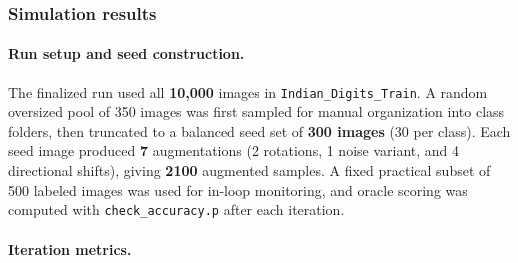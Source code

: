 \subsubsection{Simulation results}

\paragraph{Run setup and seed construction.}
The finalized run used all \textbf{10,000} images in \texttt{Indian\_Digits\_Train}. A random oversized pool of 350 images was first sampled for manual organization into class folders, then truncated to a balanced seed set of \textbf{300 images} (30 per class).
Each seed image produced \textbf{7} augmentations (2 rotations, 1 noise variant, and 4 directional shifts), giving \textbf{2100} augmented samples. A fixed practical subset of 500 labeled images was used for in-loop monitoring, and oracle scoring was computed with \texttt{check\_accuracy.p} after each iteration.

\paragraph{Iteration metrics.}
\begin{table}[H]
\centering
\caption{Pipeline 2 iteration metrics (active learning + pseudo-labeling)}
\label{tab:part3_pipeline2_iterations}
\end{table}


